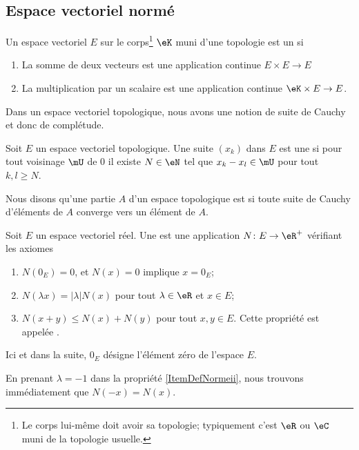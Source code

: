 \subsection{Espace vectoriel normé}

\begin{definition}
    Un espace vectoriel \( E\) sur le corps\footnote{Le corps lui-même doit avoir sa topologie; typiquement c'est \( \eR\) ou \( \eC\) muni de la topologie usuelle.} \( \eK\) muni d'une topologie est un  si
    \begin{enumerate}
        \item
            La somme de deux vecteurs est une application continue \( E\times E\to E\)
        \item
            La multiplication par un scalaire est une application continue \( \eK\times E\to E\).
    \end{enumerate}
\end{definition}
Dans un espace vectoriel topologique, nous avons une notion de suite de Cauchy et donc de complétude.

\begin{definition}   \label{DefZSnlbPc}
    Soit \( E\) un espace vectoriel topologique. Une suite \( (x_k)\) dans \( E\) est une  si pour tout voisinage \( \mU\) de \( 0\) il existe \( N\in \eN\) tel que \( x_k-x_l\in\mU\) pour tout \( k,l\geq N\).
\end{definition}

\begin{definition}
    Nous disons qu'une partie \( A\) d'un espace topologique est  si toute suite de Cauchy d'éléments de \( A\) converge vers un élément de \( A\).
\end{definition}

\begin{definition}		\label{DefNorme}
	Soit $E$ un espace vectoriel réel. Une  est une application $N\colon E\to \eR^+$ vérifiant les axiomes 
	\begin{enumerate}

		\item
			$N(0_E)=0$, et $N(x)=0$ implique $x=0_E$;
		\item\label{ItemDefNormeii}
			$N(\lambda x)=| \lambda |N(x)$ pour tout $\lambda\in\eR$ et $x\in E$;
		\item\label{ItemDefNormeiii}
			$N(x+y)\leq N(x)+N(y)$ pour tout $x,y\in E$. Cette propriété est appelée .
	\end{enumerate}
	Ici et dans la suite, $0_E$ désigne l'élément zéro de l'espace $E$.
\end{definition}
En prenant $\lambda=-1$ dans la propriété \ref{ItemDefNormeii}, nous trouvons immédiatement que $N(-x)=N(x)$.

